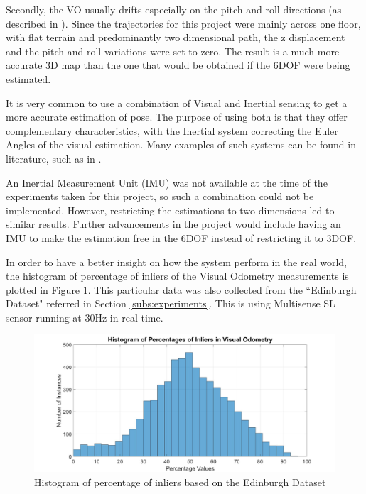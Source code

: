 \documentclass[11pt]{article}
\begin{document}
Secondly, the VO usually drifts especially on the pitch and roll directions (as described in \cite{usenko2016direct}). Since the trajectories for this project were mainly across one floor, with flat terrain and predominantly two dimensional path, the z displacement and the pitch and roll variations were set to zero. The result is a much more accurate 3D map than the one that would be obtained if the 6DOF were being estimated.
	
It is very common to use a combination of Visual and Inertial sensing to get a more accurate estimation of pose. The purpose of using both is that they offer complementary characteristics, with the Inertial system correcting the Euler Angles of the visual estimation. Many examples of such systems can be found in literature, such as in \cite{usenko2016direct}.

An Inertial Measurement Unit (IMU) was not available at the time of the experiments taken for this project, so such a combination could not be implemented. However, restricting the estimations to two dimensions led to similar results. Further advancements in the project would include having an IMU to make the estimation free in the 6DOF instead of restricting it to 3DOF.

In order to have a better insight on how the system perform in the real world, the histogram of percentage of inliers of the Visual Odometry measurements is plotted in Figure \ref{fig:PorcentageInliers}. This particular data was also collected from the ``Edinburgh Dataset" referred in Section \ref{subs:experiments}. This is using Multisense SL sensor running at 30Hz in real-time.

\begin{figure}[h]
	\includegraphics[width=\linewidth]{VisualOdometry/PercentageHistogram}
	\caption{Histogram of percentage of inliers based on the Edinburgh Dataset}
	\label{fig:PorcentageInliers}
\end{figure}
\end{document}
